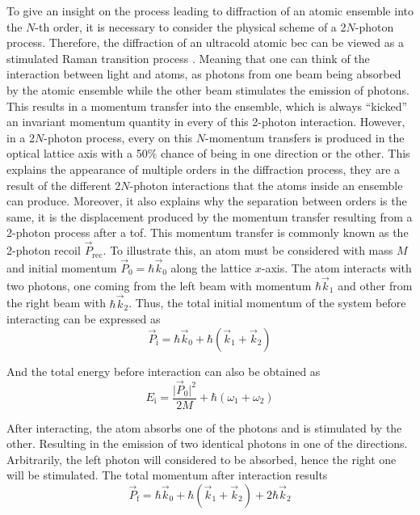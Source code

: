 To give an insight on the process leading to diffraction of an atomic ensemble into the $N$-th order, it is necessary to consider the physical scheme of a 2$N$-photon process. Therefore, the diffraction of an ultracold atomic \ac{bec} can be viewed as a stimulated Raman transition process \cite{Kozuma1999}. Meaning that one can think of the interaction between light and atoms, as photons from one beam being absorbed by the atomic ensemble while the other beam stimulates the emission of photons. This results in a momentum transfer into the ensemble, which is always ``kicked'' an invariant momentum quantity in every of this 2-photon interaction. However, in a 2$N$-photon process, every on this $N$-momentum transfers is produced in the optical lattice axis with a 50$\%$ chance of being in one direction or the other. This explains the appearance of multiple orders in the diffraction process, they are a result of the different 2$N$-photon interactions that the atoms inside an ensemble can produce. Moreover, it also explains why the separation between orders is the same, it is the displacement produced by the momentum transfer resulting from a 2-photon process after a \ac{tof}. This momentum transfer is commonly known as the 2-photon recoil $\vec{P}_\text{rec}$. To illustrate this, an atom must be considered with mass $M$ and initial momentum $\vec{P}_0 = \hbar \vec{k}_0$ along the lattice $x$-axis. The atom interacts with two photons, one coming from the left beam with momentum $\hbar \vec{k}_1$ and other from the right beam with $\hbar \vec{k}_2$. Thus, the total initial momentum of the system before interacting can be expressed as
\begin{equation}
	\vec{P}_\text{i} = \hbar \vec{k}_0 + \hbar (\vec{k}_1 + \vec{k}_2)
\end{equation}

And the total energy before interaction can also be obtained as
\begin{equation}\label{eq:bragg_energy_initial}
	E_\text{i} = \frac{\mathopen\big|\vec{P}_0\mathclose\big|^2}{2M} + \hbar (\omega_1 + \omega_2)
\end{equation}

After interacting, the atom absorbs one of the photons and is stimulated by the other. Resulting in the emission of two identical photons in one of the directions. Arbitrarily, the left photon will considered to be absorbed, hence the right one will be stimulated. The total momentum after interaction results
\begin{equation}
	\vec{P}_\text{f} = \hbar \vec{k}_0 + \hbar (\vec{k}_1 + \vec{k}_2) + 2\hbar\vec{k}_2
\end{equation}

